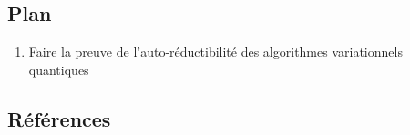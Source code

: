 \subsection*{Plan}

\begin{enumerate}
    \item Faire la preuve de l'auto-réductibilité des algorithmes variationnels quantiques
\end{enumerate}

\subsection*{Références}



